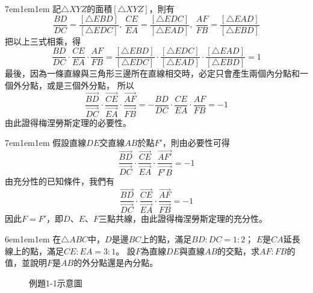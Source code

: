\documentclass[12pt]{article}
\begin{document}
\begin{mybox}[必要性證明]{7em}{1em}{1em}
    記$\triangle{XYZ}$的面積$[\triangle{XYZ}]$，則有
    $$
        \frac{BD}{DC}=\frac{[\triangle{EBD}]}{[\triangle{EDC}]},\ 
        \frac{CE}{EA}=\frac{[\triangle{EDC}]}{[\triangle{EAD}]},\ 
        \frac{AF}{FB}=\frac{[\triangle{EAD}]}{[\triangle{EBD}]}
    $$
    把以上三式相乘，得
    $$
        \frac{BD}{DC}
        \cdot\frac{CE}{EA}
        \cdot\frac{AF}{FB}
        =\frac{[\triangle{EBD}]}{[\triangle{EDC}]}
        \cdot\frac{[\triangle{EDC}]}{[\triangle{EAD}]}
        \cdot\frac{[\triangle{EAD}]}{[\triangle{EBD}]}
        =1
    $$
    最後，因為一條直線與三角形三邊所在直線相交時，必定只會產生兩個內分點和一個外分點，或是三個外分點，
    所以
    $$
        \frac{\overrightarrow{BD}}{\overrightarrow{DC}}
        \cdot\frac{\overrightarrow{CE}}{\overrightarrow{EA}}
        \cdot\frac{\overrightarrow{AF}}{\overrightarrow{FB}}
        =-\frac{BD}{DC}
        \cdot\frac{CE}{EA}
        \cdot\frac{AF}{FB}=-1
    $$
    由此證得梅涅勞斯定理的必要性。
\end{mybox}
\begin{mybox}[充分性證明]{7em}{1em}{1em}
    假設直線$DE$交直線$AB$於點$F'$，則由必要性可得
    $$
        \frac{\overrightarrow{BD}}{\overrightarrow{DC}}
        \cdot\frac{\overrightarrow{CE}}{\overrightarrow{EA}}
        \cdot\frac{\overrightarrow{AF'}}{\overrightarrow{F'B}}=-1
    $$
    由充分性的已知條件，我們有
    $$
        \frac{\overrightarrow{BD}}{\overrightarrow{DC}}
        \cdot\frac{\overrightarrow{CE}}{\overrightarrow{EA}}
        \cdot\frac{\overrightarrow{AF}}{\overrightarrow{FB}}=-1
    $$
    因此$F=F'$，即$D$、$E$、$F$三點共線，由此證得梅涅勞斯定理的充分性。
\end{mybox}
\begin{mybox}[例題\thesection-1]{6em}{1em}{1em}
    在$\triangle{ABC}$中，$D$是邊$BC$上的點，滿足$BD:DC=1:2$；
    $E$是$CA$延長線上的點，滿足$CE:EA=3:1$。
    設$F$為直線$DE$與直線$AB$的交點，求$AF:FB$的值，並說明$F$是$AB$的外分點還是內分點。
    \stepcounter{figure}
    \begin{figure}[H]
        \centering 
        \caption{例題1-1示意圖}
        \label{fig:coline_s1-3}
    \end{figure}
\end{mybox}
\end{document}
